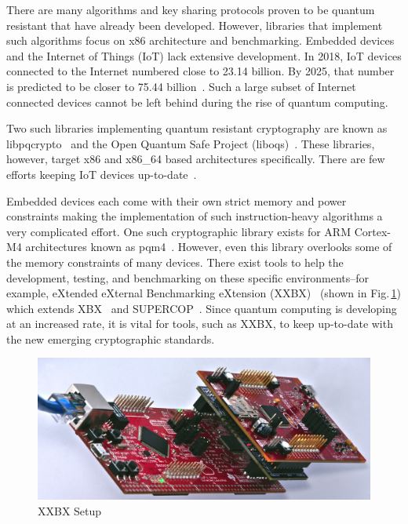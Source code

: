 \documentclass[10pt]{article}
\begin{document}
There are many algorithms and key sharing protocols proven to be quantum resistant that have 
already been developed. However, libraries that implement such algorithms focus on x86 
architecture and benchmarking. Embedded devices and the Internet of Things (IoT) lack extensive 
development. In 2018, IoT devices connected to the Internet numbered close to 23.14 billion. 
By 2025, that number is predicted to be closer to 75.44 billion~\cite{2610}.
Such a large subset of Internet 
connected devices cannot be left behind during the rise of quantum computing.

Two such libraries implementing quantum resistant cryptography are known as libpqcrypto~\cite{libpqcrypto} 
and the Open Quantum Safe Project (liboqs)~\cite{openquantumsave}. These libraries, however, target 
x86 and x86\_64 based architectures specifically. There are few efforts keeping IoT devices 
up-to-date~\cite{MALINA2018462}.

Embedded devices each come with their own strict memory and power constraints making the 
implementation of such instruction-heavy algorithms a very complicated effort. One such 
cryptographic library exists for ARM Cortex-M4 architectures known as pqm4~\cite{PQM4}. 
However, even this library overlooks some of the memory constraints of many devices. 
There exist tools to help the development, testing, and benchmarking on these specific 
environments--for example, eXtended eXternal Benchmarking eXtension (XXBX)~\cite{PK15,Kap16}
(shown in Fig.\,\ref{fig:xxbx_setup}) which extends 
XBX~\cite{xbx} and SUPERCOP~\cite{SUP06}.  Since quantum computing is developing at an increased rate, 
it is vital for tools, such as XXBX, to keep up-to-date with the 
new emerging cryptographic standards.

\begin{figure}[ht]
    \centering
    \includegraphics[scale=1.0]{../figures/xxbx-tilted}
    \caption{XXBX Setup}
    \label{fig:xxbx_setup}
\end{figure}
\end{document}
